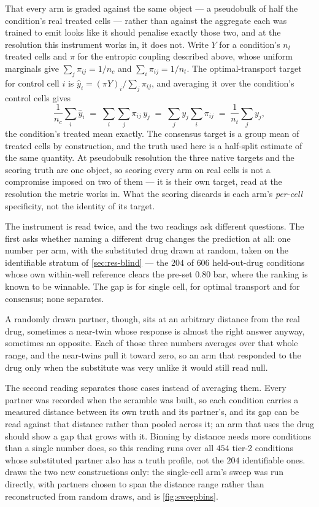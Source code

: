 That every arm is graded against the same object — a pseudobulk of half the condition's real treated cells — rather than against the aggregate each was trained to emit looks like it should penalise exactly those two, and at the resolution this instrument works in, it does not. Write $Y$ for a condition's $n_t$ treated cells and $\pi$ for
the entropic coupling described above, whose uniform marginals give
$\sum_j \pi_{ij} = 1/n_c$ and $\sum_i \pi_{ij} = 1/n_t$. The optimal-transport
target for control cell $i$ is $\hat{y}_i = (\pi Y)_i \big/ \sum_j \pi_{ij}$, and
averaging it over the condition's control cells gives
\begin{equation}
 \frac{1}{n_c}\sum_{i} \hat{y}_i
 \;=\; \sum_{i}\sum_{j} \pi_{ij}\, y_j
 \;=\; \sum_{j} y_j \sum_{i} \pi_{ij}
 \;=\; \frac{1}{n_t}\sum_{j} y_j ,
\end{equation}
the condition's treated mean exactly. The consensus target is a group mean of
treated cells by construction, and the truth used here is a half-split estimate
of the same quantity. At pseudobulk resolution the three native targets and the
scoring truth are one object, so scoring every arm on real cells is not a
compromise imposed on two of them --- it is their own target, read at the
resolution the metric works in. What the scoring discards is each arm's
\emph{per-cell} specificity, not the identity of its target.

The instrument is read twice, and the two readings ask different questions. The
first asks whether naming a different drug changes the prediction at all: one
number per arm, with the substituted drug drawn at random, taken on the
identifiable stratum of \cref{sec:res-blind} --- the $\num{204}$ of $\num{606}$
held-out-drug conditions whose own within-well reference clears the pre-set
$0.80$ bar, where the ranking is known to be winnable. The gap is
 for single cell,  for
optimal transport and  for consensus; none separates.

A randomly drawn partner, though, sits at an arbitrary distance from the real drug, sometimes a near-twin whose response is almost the right answer anyway,
sometimes an opposite. Each of those three numbers averages over that whole
range, and the near-twins pull it toward zero, so an arm that responded to the
drug only when the substitute was very unlike it would still read null.

The second reading separates those cases instead of averaging them. Every partner
was recorded when the scramble was built, so each condition carries a measured
distance between its own truth and its partner's, and its gap can be read against
that distance rather than pooled across it; an arm that uses the drug should show
a gap that grows with it. Binning by distance needs more conditions than a single
number does, so this reading runs over all $\num{454}$ tier-2 conditions whose
substituted partner also has a truth profile, not the $\num{204}$ identifiable
ones.  draws the two new constructions only: the single-cell
arm's sweep was run directly, with partners chosen to span the distance range
rather than reconstructed from random draws, and is \cref{fig:sweepbins}.

